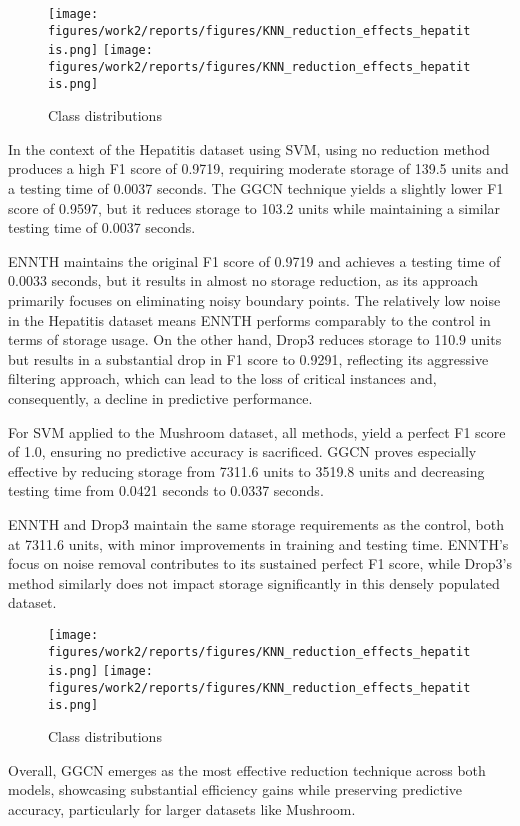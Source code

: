 \begin{figure}
    \centering
    \texttt{[image: figures/work2/reports/figures/KNN\_reduction\_effects\_hepatitis.png]}
    \texttt{[image: figures/work2/reports/figures/KNN\_reduction\_effects\_hepatitis.png]}
    \caption{Class distributions}
    \label{fig:class-distributions}
\end{figure}

In the context of the Hepatitis dataset using SVM, using no reduction method produces a high F1 score of 0.9719, requiring moderate storage of 139.5 units and a testing time of 0.0037 seconds.
The GGCN technique yields a slightly lower F1 score of 0.9597, but it reduces storage to 103.2 units while maintaining a similar testing time of 0.0037 seconds.

ENNTH maintains the original F1 score of 0.9719 and achieves a testing time of 0.0033 seconds, but it results in almost no storage reduction, as its approach primarily focuses on eliminating noisy boundary points. 
The relatively low noise in the Hepatitis dataset means ENNTH performs comparably to the control in terms of storage usage.
On the other hand, Drop3 reduces storage to 110.9 units but results in a substantial drop in F1 score to 0.9291, reflecting its aggressive filtering approach, which can lead to the loss of critical instances and, consequently, a decline in predictive performance.

For SVM applied to the Mushroom dataset, all methods, yield a perfect F1 score of 1.0, ensuring no predictive accuracy is sacrificed. 
GGCN proves especially effective by reducing storage from 7311.6 units to 3519.8 units and decreasing testing time from 0.0421 seconds to 0.0337 seconds.

ENNTH and Drop3 maintain the same storage requirements as the control, both at 7311.6 units, with minor improvements in training and testing time.
ENNTH’s focus on noise removal contributes to its sustained perfect F1 score, while Drop3’s method similarly does not impact storage significantly in this densely populated dataset.

\begin{figure}
    \centering
    \texttt{[image: figures/work2/reports/figures/KNN\_reduction\_effects\_hepatitis.png]}
    \texttt{[image: figures/work2/reports/figures/KNN\_reduction\_effects\_hepatitis.png]}
    \caption{Class distributions}
    \label{fig:class-distributions}
\end{figure}

Overall, GGCN emerges as the most effective reduction technique across both models, showcasing substantial efficiency gains while preserving predictive accuracy, particularly for larger datasets like Mushroom.


